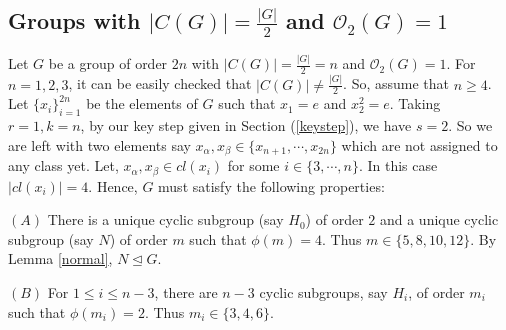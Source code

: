 \documentclass[a4paper,11pt]{amsart}
\numberwithin{equation}{section}
\numberwithin{equation}{subsection}
\begin{document}
\subsection{Groups with \texorpdfstring{$|C(G)|=\frac{|G|}{2}$}{|C(G)|=|G|/2} and \texorpdfstring{$\mathcal{O}_2(G)=1$}{O2(G)=1}}\label{o2(G)=1, |G|/2}

 Let $G$ be a group of order $2n$ with $|C(G)| = \frac{|G|}{2} = n$ and $\mathcal{O}_2(G)=1$. For $n = 1, 2, 3$, it can be easily checked that $|C(G)| \neq \frac{|G|}{2}$. So,  assume that $n\geq 4$. 
 Let $\{x_i\}_{i=1}^{2n}$ be the elements of $G$ such that $x_1 = e$ and $x_2^2 = e$. 
Taking $r=1, k=n$, by our key step given in Section (\ref{keystep}), we have $s=2$. So we are left with two elements say $x_\alpha , x_\beta \in \{x_{n+1}, \cdots, x_{2n}\}$ which are not assigned to any class yet. Let, $x_\alpha, x_\beta\in cl(x_i)$ for some $i\in \{3,\cdots,n\}$.  In this case $|cl(x_i)|=4$. Hence,   $G$ must satisfy the following properties: 


 
 
$(A)$ There is a unique cyclic subgroup (say $H_0$) of order $2$
and a unique cyclic subgroup (say $N$) of order $m$ such that $\phi(m) = 4$. Thus $m\in \{5,8,10,12\}$. 
By Lemma \ref{normal}, $N\trianglelefteq G$.

$(B)$ For $1\leq i \leq {n-3}$, there are $n-3$ cyclic subgroups, say $H_i$, of order $m_i$ such that $\phi(m_i) = 2$. Thus $m_i\in \{3,4,6\}$. 
\end{document}
